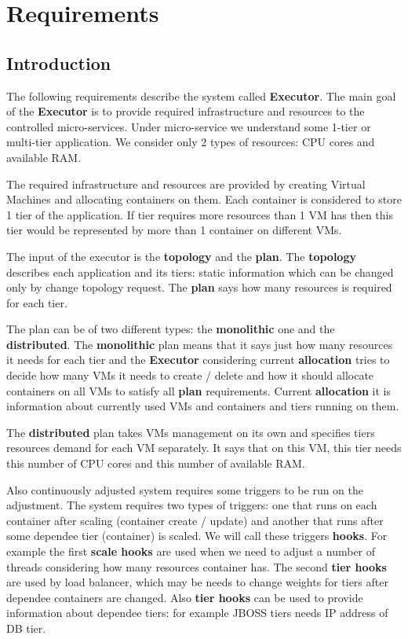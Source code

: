 \chapter{Requirements}
\label{requirements}
\section{Introduction}

The following requirements describe the system called \textbf{Executor}. The main goal of the \textbf{Executor} is to provide required infrastructure and resources to the controlled micro-services.
Under micro-service we understand some 1-tier or multi-tier application. We consider only 2 types of resources: CPU cores and available RAM. 

The required infrastructure and resources are provided by creating Virtual Machines and allocating containers on them. Each container is considered to store 1 tier of the application. If tier requires more resources than 1 VM has then this tier would be represented by more than 1 container on different VMs.

The input of the executor is the \textbf{topology} and the \textbf{plan}. 
The \textbf{topology} describes each application and its tiers:
static information which can be changed only by change topology request. The \textbf{plan} says how many resources is required for each tier. 

The plan can be of two different types: the \textbf{monolithic} one and the \textbf{distributed}. The \textbf{monolithic} plan means that it says just how many resources it needs for each tier and the \textbf{Executor} considering current \textbf{allocation} tries to decide how many VMs it needs to create / delete and how it should allocate containers on all VMs to satisfy all \textbf{plan} requirements. Current \textbf{allocation} it is information about currently used VMs and containers and tiers running on them.

The \textbf{distributed} plan takes VMs management on its own and specifies tiers resources demand for each VM separately. It says that on this VM, this tier needs this number of CPU cores and this number of available RAM.

Also continuously adjusted system requires some triggers to be run on the adjustment. The system requires two types of triggers: one that runs on each container after scaling (container create / update) and another that runs after some dependee tier (container) is scaled. We will call these triggers \textbf{hooks}. For example the first \textbf{scale hooks} are used when we need to adjust a number of threads considering how many resources container has. The second \textbf{tier hooks} are used by load balancer, which may be needs to change weights for tiers after dependee containers are changed. Also \textbf{tier hooks} can be used to provide information about dependee tiers: for example JBOSS tiers needs IP address of DB tier.

